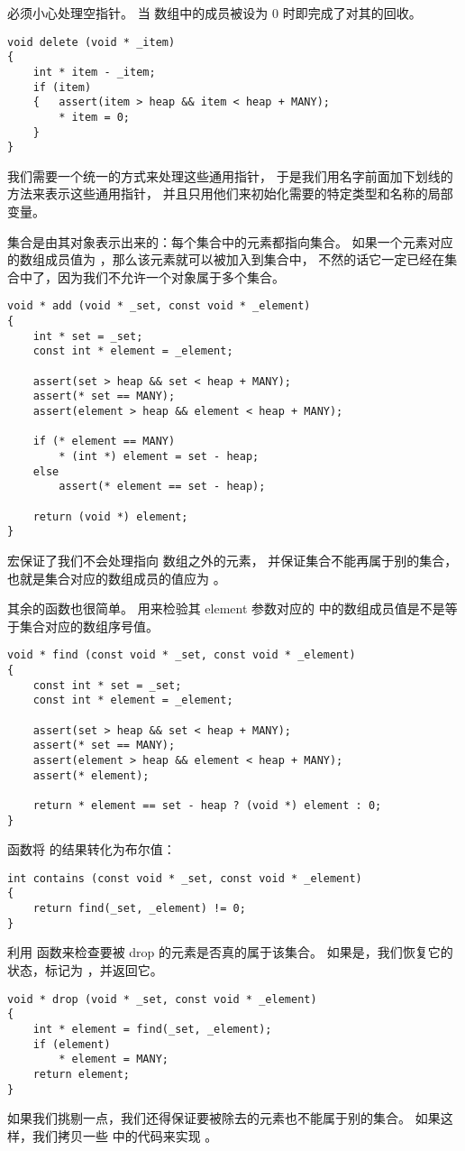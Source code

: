  必须小心处理空指针。
当  数组中的成员被设为 0 时即完成了对其的回收。
\begin{lstlisting}
void delete (void * _item)
{
	int * item - _item;
	if (item)
	{	assert(item > heap && item < heap + MANY);
		* item = 0;
	}
}
\end{lstlisting}
我们需要一个统一的方式来处理这些通用指针，
于是我们用名字前面加下划线的方法来表示这些通用指针，
并且只用他们来初始化需要的特定类型和名称的局部变量。

集合是由其对象表示出来的：每个集合中的元素都指向集合。
如果一个元素对应的数组成员值为 ，那么该元素就可以被加入到集合中，
不然的话它一定已经在集合中了，因为我们不允许一个对象属于多个集合。
\begin{lstlisting}
void * add (void * _set, const void * _element)
{
	int * set = _set;
	const int * element = _element;

	assert(set > heap && set < heap + MANY);
	assert(* set == MANY);
	assert(element > heap && element < heap + MANY);

	if (* element == MANY)
		* (int *) element = set - heap;
	else
		assert(* element == set - heap);

	return (void *) element;
}
\end{lstlisting}

 宏保证了我们不会处理指向  数组之外的元素，
并保证集合不能再属于别的集合，也就是集合对应的数组成员的值应为 。

其余的函数也很简单。 用来检验其 element 参数对应的
 中的数组成员值是不是等于集合对应的数组序号值。

\begin{lstlisting}
void * find (const void * _set, const void * _element)
{
	const int * set = _set;
	const int * element = _element;

	assert(set > heap && set < heap + MANY);
	assert(* set == MANY);
	assert(element > heap && element < heap + MANY);
	assert(* element);

	return * element == set - heap ? (void *) element : 0;
}
\end{lstlisting}
 函数将  的结果转化为布尔值：
\begin{lstlisting}
int contains (const void * _set, const void * _element)
{
	return find(_set, _element) != 0;
}
\end{lstlisting}
 利用  函数来检查要被 drop 的元素是否真的属于该集合。
如果是，我们恢复它的状态，标记为 ，并返回它。
\begin{lstlisting}
void * drop (void * _set, const void * _element)
{
	int * element = find(_set, _element);
	if (element)
		* element = MANY;
	return element;
}
\end{lstlisting}
如果我们挑剔一点，我们还得保证要被除去的元素也不能属于别的集合。
如果这样，我们拷贝一些  中的代码来实现 。

